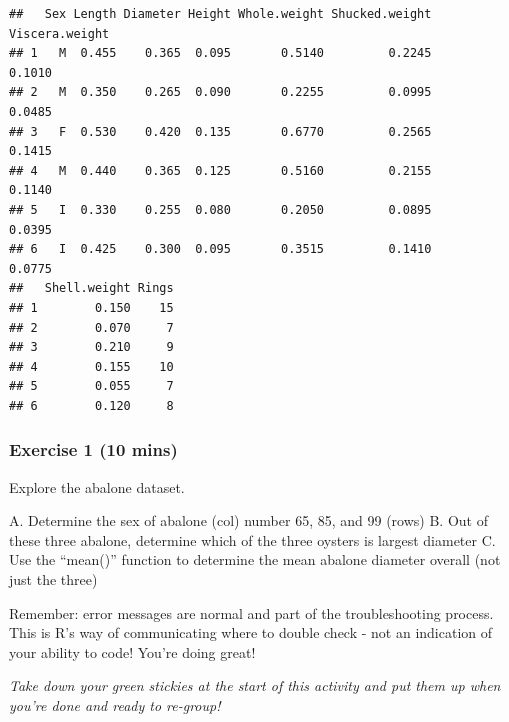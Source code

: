 \documentclass[
]{book}
\newenvironment{Shaded}{\begin{snugshade}}{\end{snugshade}}
\newcommand{\CommentTok}[1]{\textcolor[rgb]{0.56,0.35,0.01}{\textit{#1}}}
\newcommand{\DecValTok}[1]{\textcolor[rgb]{0.00,0.00,0.81}{#1}}
\newcommand{\FunctionTok}[1]{\textcolor[rgb]{0.13,0.29,0.53}{\textbf{#1}}}
\newcommand{\NormalTok}[1]{#1}
\newcommand{\SpecialCharTok}[1]{\textcolor[rgb]{0.81,0.36,0.00}{\textbf{#1}}}
\begin{document}
\begin{verbatim}
##   Sex Length Diameter Height Whole.weight Shucked.weight Viscera.weight
## 1   M  0.455    0.365  0.095       0.5140         0.2245         0.1010
## 2   M  0.350    0.265  0.090       0.2255         0.0995         0.0485
## 3   F  0.530    0.420  0.135       0.6770         0.2565         0.1415
## 4   M  0.440    0.365  0.125       0.5160         0.2155         0.1140
## 5   I  0.330    0.255  0.080       0.2050         0.0895         0.0395
## 6   I  0.425    0.300  0.095       0.3515         0.1410         0.0775
##   Shell.weight Rings
## 1        0.150    15
## 2        0.070     7
## 3        0.210     9
## 4        0.155    10
## 5        0.055     7
## 6        0.120     8
\end{verbatim}

\subsubsection{Exercise 1 (10 mins)}\label{exercise-1-10-mins}

Explore the abalone dataset.

A. Determine the sex of abalone (col) number 65, 85, and 99 (rows)
B. Out of these three abalone, determine which of the three oysters is largest diameter
C. Use the ``mean()'' function to determine the mean abalone diameter overall (not just the three)

Remember: error messages are normal and part of the troubleshooting process. This is R's way of communicating where to double check - not an indication of your ability to code! You're doing great!

\emph{Take down your green stickies at the start of this activity and put them up when you're done and ready to re-group!}

\begin{Shaded}
\end{Shaded}
\end{document}
